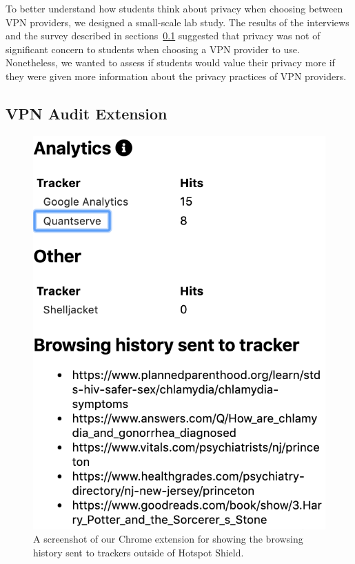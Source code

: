 To better understand how students think about privacy when choosing between VPN providers, we designed a small-scale lab study.
The results of the interviews and the survey described in sections~\ref{} suggested that privacy was not of significant concern to students when choosing a VPN provider to use.
Nonetheless, we wanted to assess if students would value their privacy more if they were given more information about the privacy practices of VPN providers.

\subsection{VPN Audit Extension}

\begin{figure}[t]
    \includegraphics[width=0.85\linewidth]{sections/figures/vpn-audit.png}
    \caption{A screenshot of our Chrome extension for showing the browsing history sent to trackers outside of Hotspot Shield.}
    \label{fig:vpn-audit}
\end{figure}

